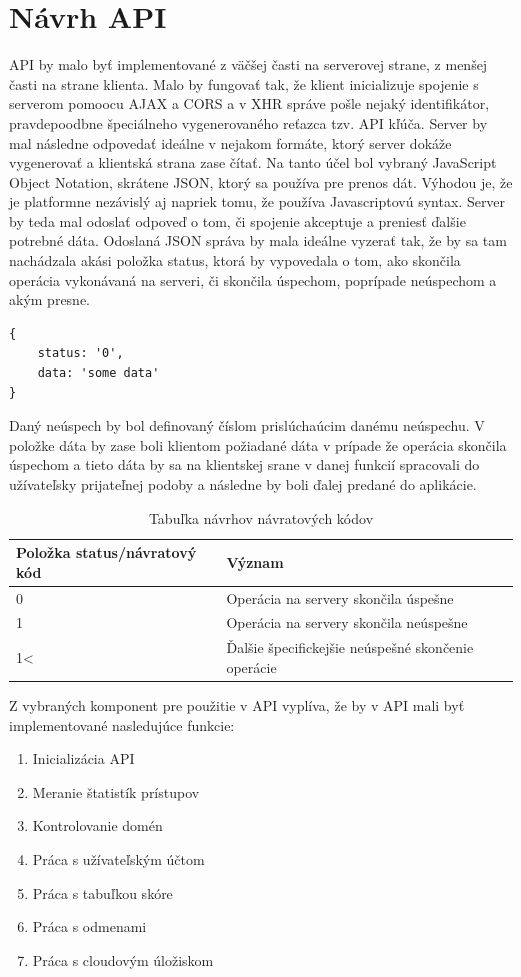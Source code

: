 \section{Návrh API}
API by malo byť implementované z väčšej časti na serverovej strane, z menšej časti na strane klienta. Malo by fungovať tak, že klient inicializuje spojenie s serverom pomoocu AJAX a CORS a v XHR správe pošle nejaký identifikátor, pravdepoodbne špeciálneho vygenerovaného reťazca tzv. API kľúča. Server by mal následne odpovedať ideálne v nejakom formáte, ktorý server dokáže vygenerovať a klientská strana zase čítať. Na tanto účel bol vybraný JavaScript Object Notation, skrátene JSON, ktorý sa používa pre prenos dát. Výhodou je, že je platformne nezávislý aj napriek tomu, že používa Javascriptovú syntax. Server by teda mal odoslať odpoveď o tom, či spojenie akceptuje a preniesť ďalšie potrebné dáta. Odoslaná JSON správa by mala ideálne vyzerať tak, že by sa tam nachádzala akási položka status, ktorá by vypovedala o tom, ako skončila operácia vykonávaná na serveri, či skončila úspechom, poprípade neúspechom a akým presne.  
\begin{lstlisting}[caption=JSON]
{
    status: '0',
    data: 'some data'
}
\end{lstlisting}
Daný neúspech by bol definovaný číslom prislúchaúcim danému neúspechu. V položke dáta by zase boli klientom požiadané dáta v prípade že operácia skončila úspechom a tieto dáta by sa na klientskej srane v danej funkcií spracovali do užívateľsky prijateľnej podoby a následne by boli ďalej predané do aplikácie.
\begin{table}[h]
\centering
\begin{tabular}{|l|l|l|}
\hline
Položka status/návratový kód & Význam \\ \hline
0 & Operácia na servery skončila úspešne \\ \hline
1 & Operácia na servery skončila neúspešne \\ \hline
1\textless & Ďalšie špecifickejšie neúspešné skončenie operácie \\ \hline
\end{tabular}
\label{navratovekody}
\caption{Tabuľka návrhov návratových kódov}
\end{table}

Z vybraných komponent pre použitie v API vyplíva, že by v API mali byť implementované nasledujúce funkcie:
\begin{enumerate}
\item Inicializácia API
\item Meranie štatistík prístupov
\item Kontrolovanie domén
\item Práca s užívateľským účtom
\item Práca s tabuľkou skóre
\item Práca s odmenami
\item Práca s cloudovým úložiskom
\end{enumerate}

